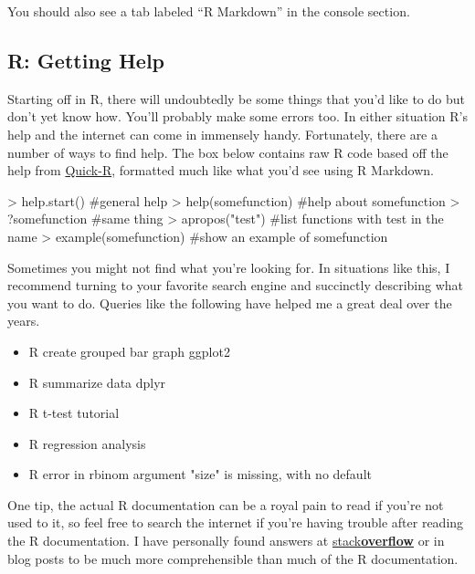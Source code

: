 \documentclass[12pt]{article}
\begin{document}
You should also see a tab labeled ``R Markdown'' in the console section.

\subsection{R: Getting Help}
Starting off in R, there will undoubtedly be some things that you'd like to do but
don't yet know how. You'll probably make some errors too. In either situation
R's help and the internet can come in immensely handy. Fortunately, there are a number
of ways to find help. The box below contains raw R code based off the help from
\href{http://www.statmethods.net/interface/help.html}{Quick-R}, formatted much like what
you'd see using R Markdown.


\begin{Schunk}
\begin{Sinput}
> help.start()          #general help
> help(somefunction)    #help about somefunction
> ?somefunction         #same thing 
> apropos("test")       #list functions with test in the name
> example(somefunction) #show an example of somefunction
\end{Sinput}
\end{Schunk}

Sometimes you might not find what you're looking for. In situations like this, I
recommend turning to your favorite search engine and succinctly describing what
you want to do. Queries like the following have helped me a great deal over
the years.

\begin{itemize}
\item R create grouped bar graph ggplot2
\item R summarize data dplyr
\item R t-test tutorial
\item R regression analysis
\item R error in rbinom argument "size" is missing, with no default
\end{itemize}

One tip, the actual R documentation can be a royal pain to read if you're
not used to it, so feel free to search the internet if you're having trouble after
reading the R documentation. I have personally found answers at
\href{http://stackoverflow.com/questions/tagged/r}{stack\textbf{overflow}} or in
blog posts to be much more comprehensible than much of the R documentation.
\end{document}
